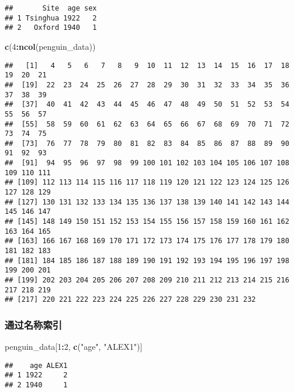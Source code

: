\documentclass[
]{article}
\newenvironment{Shaded}{\begin{snugshade}}{\end{snugshade}}
\newcommand{\DecValTok}[1]{\textcolor[rgb]{0.00,0.00,0.81}{#1}}
\newcommand{\FunctionTok}[1]{\textcolor[rgb]{0.13,0.29,0.53}{\textbf{#1}}}
\newcommand{\NormalTok}[1]{#1}
\newcommand{\SpecialCharTok}[1]{\textcolor[rgb]{0.81,0.36,0.00}{\textbf{#1}}}
\newcommand{\StringTok}[1]{\textcolor[rgb]{0.31,0.60,0.02}{#1}}
\begin{document}
\begin{verbatim}
##       Site  age sex
## 1 Tsinghua 1922   2
## 2   Oxford 1940   1
\end{verbatim}

\begin{Shaded}
\begin{Highlighting}[]
\FunctionTok{c}\NormalTok{(}\DecValTok{4}\SpecialCharTok{:}\FunctionTok{ncol}\NormalTok{(penguin\_data))}
\end{Highlighting}
\end{Shaded}

\begin{verbatim}
##   [1]   4   5   6   7   8   9  10  11  12  13  14  15  16  17  18  19  20  21
##  [19]  22  23  24  25  26  27  28  29  30  31  32  33  34  35  36  37  38  39
##  [37]  40  41  42  43  44  45  46  47  48  49  50  51  52  53  54  55  56  57
##  [55]  58  59  60  61  62  63  64  65  66  67  68  69  70  71  72  73  74  75
##  [73]  76  77  78  79  80  81  82  83  84  85  86  87  88  89  90  91  92  93
##  [91]  94  95  96  97  98  99 100 101 102 103 104 105 106 107 108 109 110 111
## [109] 112 113 114 115 116 117 118 119 120 121 122 123 124 125 126 127 128 129
## [127] 130 131 132 133 134 135 136 137 138 139 140 141 142 143 144 145 146 147
## [145] 148 149 150 151 152 153 154 155 156 157 158 159 160 161 162 163 164 165
## [163] 166 167 168 169 170 171 172 173 174 175 176 177 178 179 180 181 182 183
## [181] 184 185 186 187 188 189 190 191 192 193 194 195 196 197 198 199 200 201
## [199] 202 203 204 205 206 207 208 209 210 211 212 213 214 215 216 217 218 219
## [217] 220 221 222 223 224 225 226 227 228 229 230 231 232
\end{verbatim}

\subsubsection{通过名称索引}\label{ux901aux8fc7ux540dux79f0ux7d22ux5f15}

\begin{Shaded}
\begin{Highlighting}[]
\NormalTok{penguin\_data[}\DecValTok{1}\SpecialCharTok{:}\DecValTok{2}\NormalTok{, }\FunctionTok{c}\NormalTok{(}\StringTok{"age"}\NormalTok{, }\StringTok{"ALEX1"}\NormalTok{)]}
\end{Highlighting}
\end{Shaded}

\begin{verbatim}
##    age ALEX1
## 1 1922     2
## 2 1940     1
\end{verbatim}
\end{document}
